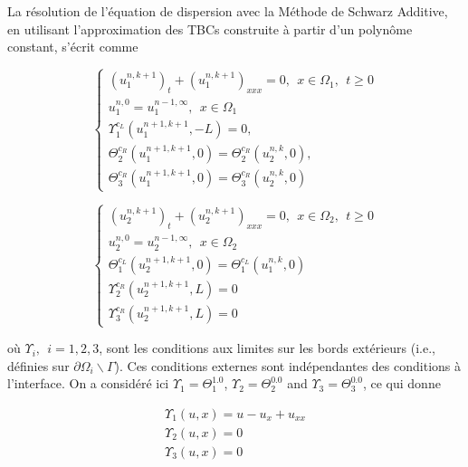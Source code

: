 \indent La résolution de l'équation de dispersion avec la Méthode de Schwarz Additive, en utilisant l'approximation des TBCs construite à partir d'un polynôme constant, s'écrit comme

\begin{equation}
    \label{eq:problemDDM1}
    \begin{cases}
        (u_1^{n,k+1})_t + (u_1^{n,k+1})_{xxx} = 0 , \ \ x \in \Omega_1, \ \ t \geq 0\\
        u_1^{n,0} = u_1^{n-1,\infty} , \ \ x \in \Omega_1 \\
        \Upsilon_1^{c_L}(u_1^{n+1,k+1},-L) = 0, \\ 
        \Theta_2^{c_R}(u_1^{n+1,k+1},0) = \Theta_2^{c_R}(u_2^{n,k},0) , \\
        \Theta_3^{c_R}(u_1^{n+1,k+1},0) = \Theta_3^{c_R}(u_2^{n,k},0)
     \end{cases}
\end{equation}

\begin{equation}
    \label{eq:problemDDM2}
    \begin{cases}
        (u_2^{n,k+1})_t + (u_2^{n,k+1})_{xxx} = 0 , \ \ x \in \Omega_2, \ \ t \geq 0\\
        u_2^{n,0} = u_2^{n-1,\infty} , \ \ x \in \Omega_2 \\
        \Theta_1^{c_L}(u_2^{n+1,k+1},0) = \Theta_1^{c_L}(u_1^{n,k},0) \\
        \Upsilon_2^{c_R}(u_2^{n+1,k+1},L) = 0 \\
        \Upsilon_3^{c_R}(u_2^{n+1,k+1},L) = 0
     \end{cases}
\end{equation}

\noindent où $ \Upsilon_i, \ \ i=1,2,3$,  sont les conditions aux limites sur les bords extérieurs (i.e., définies sur $\partial \Omega_i \backslash \Gamma$). Ces conditions externes sont indépendantes des conditions à l'interface. On a considéré ici $\Upsilon_1 = \Theta_1^{1.0}$, $\Upsilon_2 = \Theta_2^{0.0}$ and $\Upsilon_3 = \Theta_3^{0.0}$, ce qui donne 

\begin{equation}
\label{eq:externalBCsDDM}
\begin{gathered}
	\Upsilon_1(u,x) = u - u_x + u_{xx} \\
	\Upsilon_2(u,x) = 0 \\
	\Upsilon_3(u,x) = 0
\end{gathered}
\end{equation}

